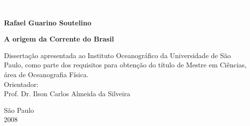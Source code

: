 \begin{titlepage}

\textcolor{white}{R}

\vspace{-1cm}

\begin{center}
{\Large \bf Rafael Guarino Soutelino}\\
\end{center}

\vspace{1.75in}

\begin{center}
{\LARGE \textbf{A origem da Corrente do Brasil}}\\
\end{center}

\renewcommand{\baselinestretch}{1.2}

\vspace{1.75in} \hspace{2.3in} \parbox[t][1.8in][t]{3.8in}{Dissertação 
apresentada ao Instituto Oceanográfico da Universidade de São 
Paulo, como parte dos requisitos para obtenção do título de Mestre em 
Ciências, área de Oceanografia Física.\\

Orientador:\\
Prof. Dr. Ilson Carlos Almeida da Silveira}

\vspace{1.75in}

\begin{center}
{\large São Paulo}\\
{\large 2008}
\end{center}


\end{titlepage}

